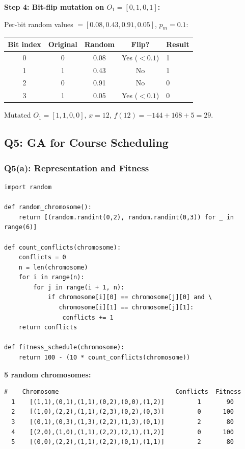 \documentclass[12pt,a4paper]{article}
\begin{document}
\textbf{Step 4: Bit-flip mutation on $O_1 = [0,1,0,1]$:}

Per-bit random values $= [0.08, 0.43, 0.91, 0.05]$, $p_m = 0.1$:

\begin{center}
\begin{tabular}{ccccl}
\toprule
Bit index & Original & Random & Flip? & Result \\
\midrule
0 & 0 & 0.08 & Yes ($< 0.1$) & 1 \\
1 & 1 & 0.43 & No            & 1 \\
2 & 0 & 0.91 & No            & 0 \\
3 & 1 & 0.05 & Yes ($< 0.1$) & 0 \\
\bottomrule
\end{tabular}
\end{center}

Mutated $O_1 = [1,1,0,0]$, $x=12$, $f(12) = -144 + 168 + 5 = 29$.

\subsection{Q5: GA for Course Scheduling}

\subsubsection*{Q5(a): Representation and Fitness}

\begin{lstlisting}[style=pycode, caption={Q5(a): Chromosome and fitness}]
import random

def random_chromosome():
    return [(random.randint(0,2), random.randint(0,3)) for _ in range(6)]

def count_conflicts(chromosome):
    conflicts = 0
    n = len(chromosome)
    for i in range(n):
        for j in range(i + 1, n):
            if chromosome[i][0] == chromosome[j][0] and \
               chromosome[i][1] == chromosome[j][1]:
                conflicts += 1
    return conflicts

def fitness_schedule(chromosome):
    return 100 - (10 * count_conflicts(chromosome))
\end{lstlisting}

\textbf{5 random chromosomes:}

\begin{lstlisting}[style=output]
  #    Chromosome                                Conflicts  Fitness
  1    [(1,1),(0,1),(1,1),(0,2),(0,0),(1,2)]         1       90
  2    [(1,0),(2,2),(1,1),(2,3),(0,2),(0,3)]         0      100
  3    [(0,1),(0,3),(1,3),(2,2),(1,3),(0,1)]         2       80
  4    [(2,0),(1,0),(1,1),(2,2),(2,1),(1,2)]         0      100
  5    [(0,0),(2,2),(1,1),(2,2),(0,1),(1,1)]         2       80
\end{lstlisting}
\end{document}
